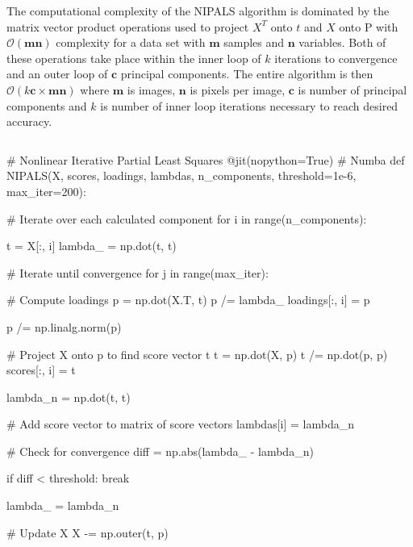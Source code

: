 \documentclass[12pt]{article}
\begin{document}
The computational complexity of the NIPALS algorithm is dominated by the matrix vector product operations used to project $X^T$ onto $t$ and $X$ onto P with $\mathcal{O}(\textbf{mn})$ complexity for a data set with $\textbf{m}$ samples and $\textbf{n}$ variables. Both of these operations take place within the inner loop of $k$ iterations to convergence and an outer loop of $\textbf{c}$ principal components. The entire algorithm is then $\mathcal{O}(k\textbf{c}\times\textbf{mn})$ where $\textbf{m}$ is images, $\textbf{n}$ is pixels per image, $\textbf{c}$ is number of principal components and $k$ is number of inner loop iterations necessary to reach desired accuracy.  
\pagebreak
\begin{lstlisting}[frame=none,caption={NIPALS Algorithm},captionpos=b,label=lst:NIPALS]
\end{lstlisting}
\begin{python}
# Nonlinear Iterative Partial Least Squares 
@jit(nopython=True) # Numba
def NIPALS(X, scores, loadings, lambdas, n_components, 
            threshold=1e-6, max_iter=200):

    # Iterate over each calculated component
    for i in range(n_components):

        t = X[:, i]
        lambda_ = np.dot(t, t) 

        # Iterate until convergence
        for j in range(max_iter):

            # Compute loadings
            p = np.dot(X.T, t)
            p /= lambda_
            loadings[:, i] = p

            p /= np.linalg.norm(p)
    
            # Project X onto p to find score vector t
            t = np.dot(X, p)
            t /= np.dot(p, p)
            scores[:, i] = t
      
            lambda_n = np.dot(t, t)

            # Add score vector to matrix of score vectors
            lambdas[i] = lambda_n

            # Check for convergence
            diff = np.abs(lambda_ - lambda_n)

            if diff < threshold:
                break

            lambda_ = lambda_n
           
        # Update X
        X -= np.outer(t, p) 
\end{python}


\end{document}
